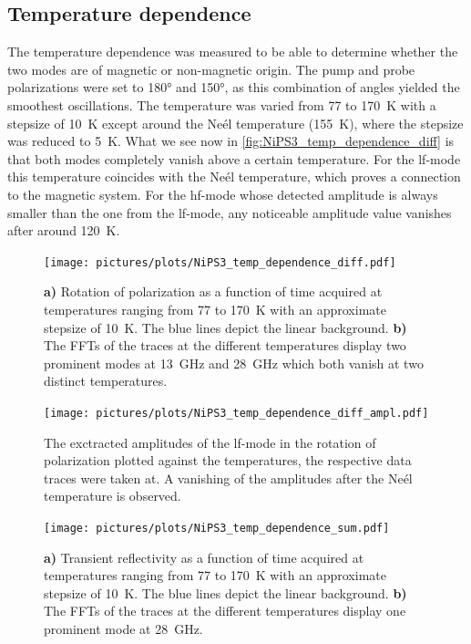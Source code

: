 \subsection{Temperature dependence}
The temperature dependence was measured to be able to determine whether the two modes are of magnetic or non-magnetic origin.
The pump and probe polarizations were set to 180° and 150°, as this combination of angles yielded the smoothest oscillations.
The temperature was varied from 77 to \qty{170}{K} with a stepsize of \qty{10}{K} except around the Neél temperature (\qty{155}{K}), where the stepsize was reduced to \qty{5}{K}.
What we see now in \autoref{fig:NiPS3_temp_dependence_diff} is that both modes completely vanish above a certain temperature.
For the lf-mode this temperature coincides with the Neél temperature, which proves a connection to the magnetic system.
For the hf-mode whose detected amplitude is always smaller than the one from the lf-mode, any noticeable amplitude value vanishes after around \qty{120}{K}.
\begin{figure}[hbt!]
    \centering
    \texttt{[image: pictures/plots/NiPS3\_temp\_dependence\_diff.pdf]} \vspace{-0.3cm}
    \caption{\textbf{a)} Rotation of polarization as a function of time acquired at temperatures ranging from 77 to \qty{170}{K} with an approximate stepsize of \qty{10}{K}. The blue lines depict the linear background. \textbf{b)} The FFTs of the traces at the different temperatures display two prominent modes at \qty{13}{GHz} and \qty{28}{GHz} which both vanish at two distinct temperatures.}
    \label{fig:NiPS3_temp_dependence_diff}
\end{figure}
\begin{figure}[hbt!]
    \centering  
    \texttt{[image: pictures/plots/NiPS3\_temp\_dependence\_diff\_ampl.pdf]} \vspace{-0.5cm}
    \caption{The exctracted amplitudes of the lf-mode in the rotation of polarization plotted against the temperatures, the respective data traces were taken at. A vanishing of the amplitudes after the Neél temperature is observed.}
    \label{fig:NiPS3_temp_dependence_diff_ampl}
\end{figure}
\FloatBarrier
\begin{figure}[hbt!]
    \centering
    \texttt{[image: pictures/plots/NiPS3\_temp\_dependence\_sum.pdf]} \vspace{-0.5cm}
    \caption{\textbf{a)} Transient reflectivity as a function of time acquired at temperatures ranging from 77 to \qty{170}{K} with an approximate stepsize of \qty{10}{K}. The blue lines depict the linear background. \textbf{b)} The FFTs of the traces at the different temperatures display one prominent mode at \qty{28}{GHz}.}
    \label{fig:NiPS3_temp_dependence_sum}
\end{figure}
